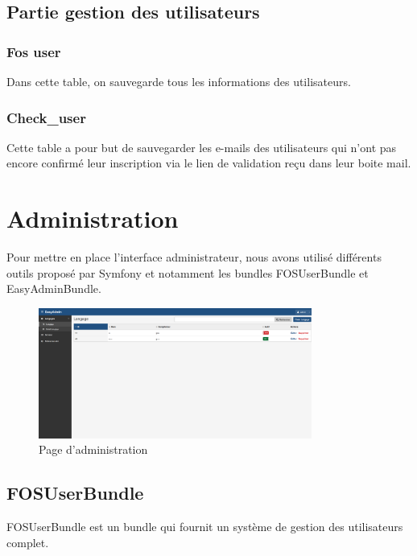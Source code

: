 \subsection{Partie gestion des utilisateurs}

\subsubsection{Fos user}

\par Dans cette table, on sauvegarde tous les informations des utilisateurs.

\subsubsection{Check\_user}

Cette table a pour but de sauvegarder les e-mails des utilisateurs qui n’ont pas encore confirmé leur inscription via le lien de validation reçu dans leur boite mail. 

\section{Administration}

\par Pour mettre en place l’interface administrateur, nous avons utilisé différents outils proposé par Symfony et notamment les bundles FOSUserBundle et EasyAdminBundle.

\begin{figure}[H]
\centering
\includegraphics[width=0.8\textwidth]{./img/admin/easyadmin_langage.png}
\caption{Page d'administration}
\end{figure}


\subsection{FOSUserBundle}

\par FOSUserBundle est un bundle qui fournit un système de gestion des utilisateurs complet. \\

